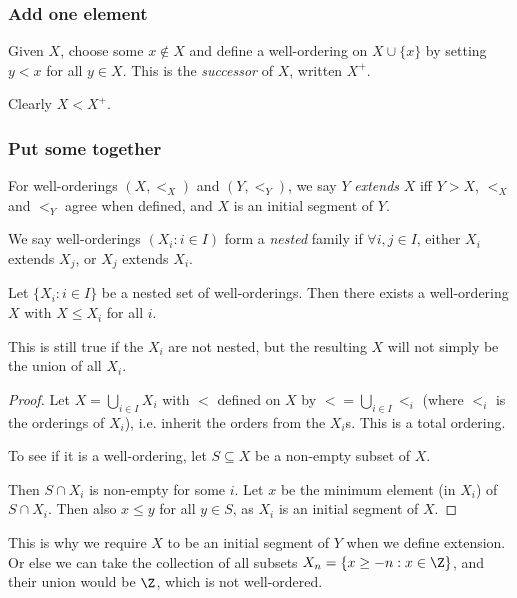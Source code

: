 \documentclass[a4paper]{article}
\begin{document}
\subsubsection*{Add one element}
\begin{defi}[Successor]
  Given $X$, choose some $x\not\in X$ and define a well-ordering on $X\cup \{x\}$ by setting $y < x$ for all $y \in X$. This is the \emph{successor} of $X$, written $X^+$.
\end{defi}
Clearly $X < X^+$.
\subsubsection*{Put some together}
\begin{defi}[Extension]
  For well-orderings $(X, <_X)$ and $(Y, <_Y)$, we say $Y$ \emph{extends} $X$ iff $Y > X$, $<_X$ and $<_Y$ agree when defined, and $X$ is an initial segment of $Y$.
\end{defi}

\begin{defi}
  We say well-orderings $(X_i: i\in I)$ form a \emph{nested} family if $\forall i, j\in I$, either $X_i$ extends $X_j$, or $X_j$ extends $X_i$.
\end{defi}

\begin{prop}
  Let $\{X_i: i\in I\}$ be a nested set of well-orderings. Then there exists a well-ordering $X$ with $X\leq X_i$ for all $i$.
\end{prop}
\note This is still true if the $X_i$ are not nested, but the resulting $X$ will not simply be the union of all $X_i$.

\begin{proof}
  Let $X = \bigcup_{i\in I}X_i$ with $<$ defined on $X$ by $< = \bigcup_{i\in I} <_i$ (where $<_i$ is the orderings of $X_i$), i.e. inherit the orders from the $X_i$s. This is a total ordering.

  To see if it is a well-ordering, let $S\subseteq X$ be a non-empty subset of $X$.

  Then $S\cap X_i$ is non-empty for some $i$. Let $x$ be the minimum element (in $X_i$) of $S\cap X_i$. Then also $x \leq y$ for all $y\in S$, as  $X_i$ is an initial segment of $X$.
\end{proof}
This is why we require $X$ to be an initial segment of $Y$ when we define extension. Or else we can take the collection of all subsets $X_n = \{x \geq -n: x\in \Z\}$, and their union would be $\Z$, which is not well-ordered.
\end{document}
